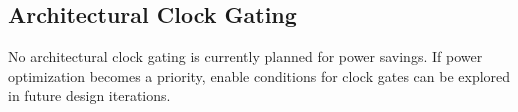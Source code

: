 \subsection{Architectural Clock Gating}

No architectural clock gating is currently planned for power savings. If power optimization becomes a priority, enable conditions for clock gates can be explored in future design iterations.

